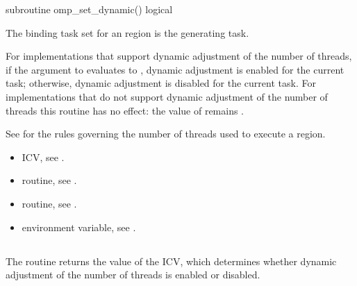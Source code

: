 \begin{samepage}
\fortranspecificstart
\begin{boxedcode}
subroutine omp\_set\_dynamic()
logical \end{boxedcode}
\fortranspecificend
\end{samepage}

\binding
The binding task set for an  region is the generating task. 

\effect
For implementations that support dynamic adjustment of the number of threads, if the 
argument to  evaluates to , dynamic adjustment is enabled for 
the current task; otherwise, dynamic adjustment is disabled for the current task. For 
implementations that do not support dynamic adjustment of the number of threads this 
routine has no effect: the value of  remains .

See  
for the rules governing the number of threads used to 
execute a\linebreak {} region. 

\crossreferences
\begin{itemize}
\item {} ICV, see 
.

\item {} routine, see 
.

\item {} routine, see 
.

\item {} environment variable, see 
.
\end{itemize}








\subsection{}
\label{subsec:omp_get_dynamic}
\summary
The  routine returns the value of the  ICV, which 
determines whether dynamic adjustment of the number of threads is enabled or disabled.

